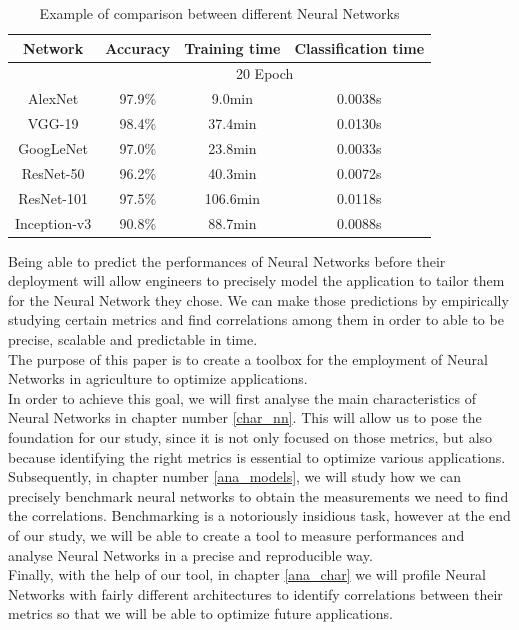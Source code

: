 \begin{table}[th]
\centering
\begin{tabular}{|c| ccc|}
  \hline
 Network &Accuracy& Training time   &Classification time   \\
 \hline
 &\multicolumn{3}{c|}{20 Epoch}\\
 \hline
AlexNet &97.9\%& 9.0min   &0.0038s    \\
VGG-19 &98.4\%& 37.4min   &0.0130s  \\
GoogLeNet &97.0\%& 23.8min  &0.0033s \\
ResNet-50 &96.2\%& 40.3min  &0.0072s\\
ResNet-101 &97.5\%& 106.6min   &0.0118s \\
Inception-v3 &90.8\%& 88.7min &0.0088s \\
\hline
\end{tabular}
\caption[Example of comparison between different Neural Networks]{Example of comparison between different Neural Networks \cite{suh_transfer_2018}}
 \label{tab:models_ex_comp}
\end{table}

Being able to predict the performances of Neural Networks before their deployment will allow engineers to precisely model the application to tailor them for the Neural Network they chose. We can make those predictions by empirically studying certain metrics and find correlations among them in order to able to be precise, scalable and predictable in time. \\
The purpose of this paper is to create a toolbox for the employment of Neural Networks in agriculture to optimize applications. \\
In order to achieve this goal, we will first analyse the main characteristics of Neural Networks in chapter number \ref{char_nn}. 
This will allow us to pose the foundation for our study, since it is not only focused on those metrics, but also because identifying the right metrics is essential to optimize various applications. \\
Subsequently, in chapter number \ref{ana_models}, we will study how we can precisely benchmark neural networks to obtain the measurements we need to find the correlations. Benchmarking is a notoriously insidious task, however at the end of our study, we will be able to create a tool to measure performances and analyse Neural Networks in a precise and reproducible way.\\
Finally, with the help of our tool, in chapter \ref{ana_char} we will profile Neural Networks with fairly different architectures to identify correlations between their metrics so that we will be able to optimize future applications. 
